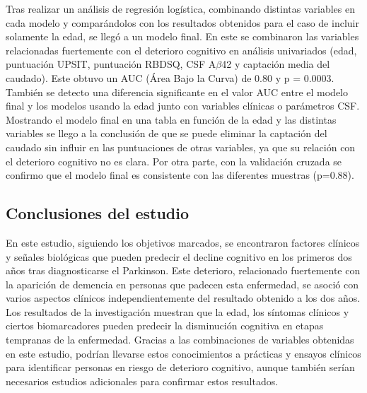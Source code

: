 \documentclass[12pt]{article}
\begin{document}
	Tras realizar un análisis de regresión logística, combinando distintas variables en cada modelo y comparándolos con los resultados obtenidos para el caso de incluir solamente la edad, se llegó a un modelo final. En este se combinaron las variables relacionadas fuertemente con el deterioro cognitivo en análisis univariados (edad, puntuación UPSIT, puntuación RBDSQ, CSF A$\beta$42 y captación media del caudado). Este obtuvo un AUC (Área Bajo la Curva) de 0.80 y p = 0.0003. También se detecto una diferencia significante en el valor AUC entre el modelo final y los modelos usando la edad junto con variables clínicas o parámetros CSF. Mostrando el modelo final en una tabla en función de la edad y las distintas variables se llego a la conclusión de que se puede eliminar la captación del caudado sin influir en las puntuaciones de otras variables, ya que su relación con el deterioro cognitivo no es clara. Por otra parte, con la validación cruzada se confirmo que el modelo final es consistente con las diferentes muestras (p=0.88).\\
	
	\subsection{Conclusiones del estudio}
	
	En este estudio, siguiendo los objetivos marcados, se encontraron factores clínicos y señales biológicas que pueden predecir el decline cognitivo en los primeros dos años tras diagnosticarse el Parkinson. Este deterioro, relacionado fuertemente con la aparición de demencia en personas que padecen esta enfermedad, se asoció con varios aspectos clínicos independientemente del resultado obtenido a los dos años. Los resultados de la investigación muestran que la edad, los síntomas clínicos y ciertos biomarcadores pueden predecir la disminución cognitiva en etapas tempranas de la enfermedad. Gracias a las combinaciones de variables obtenidas en este estudio, podrían llevarse estos conocimientos a prácticas y ensayos clínicos para identificar personas en riesgo de deterioro cognitivo, aunque también serían necesarios estudios adicionales para confirmar estos resultados.
\end{document}

